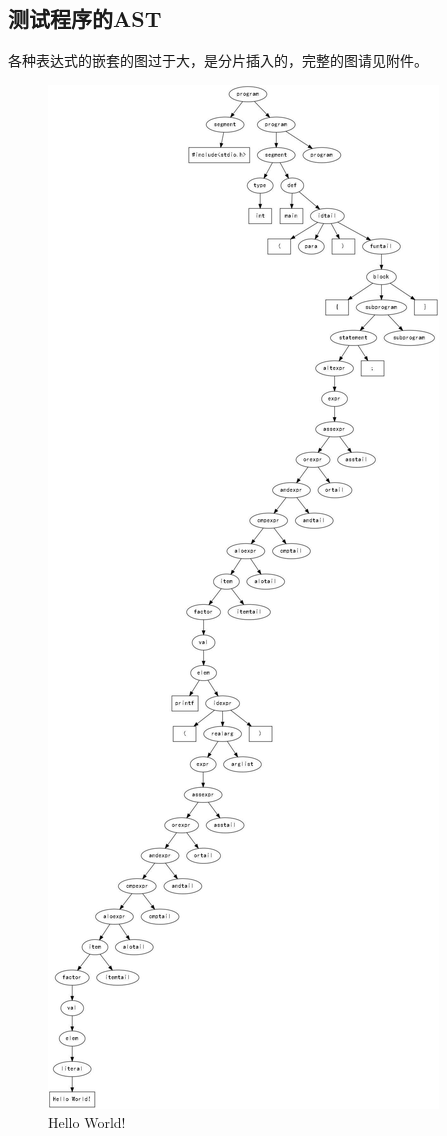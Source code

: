 \documentclass[supercite]{Experimental_Report}
\theoremstyle{definition}
\begin{document}
\subsection{测试程序的AST}
各种表达式的嵌套的图过于大，是分片插入的，完整的图请见附件。
\begin{figure}[htb]
	\begin{center}
		\includegraphics[scale=0.2]{images/HelloWorld.pdf}
		\caption{Hello World!}
		\label{fig3-1}
	\end{center}
\end{figure}
\end{document}
